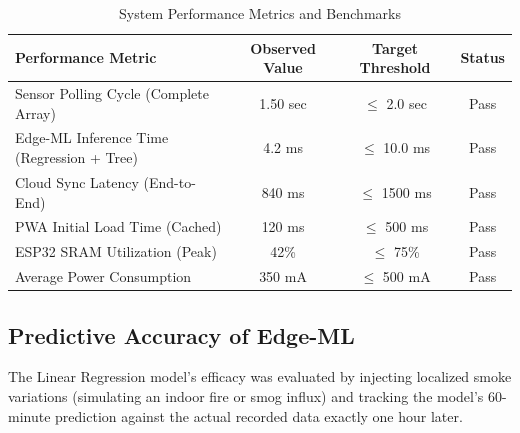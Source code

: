 \documentclass[12pt,journal,onecolumn,a4paper]{IEEEtran}
\begin{document}
\begin{table}[htbp]
\centering
\caption{System Performance Metrics and Benchmarks}
\begin{tabularx}{\textwidth}{@{} X c c c @{}}
\toprule
\textbf{Performance Metric} & \textbf{Observed Value} & \textbf{Target Threshold} & \textbf{Status} \\ \midrule
Sensor Polling Cycle (Complete Array) & 1.50 sec & $\leq$ 2.0 sec & Pass \\
Edge-ML Inference Time (Regression + Tree) & 4.2 ms & $\leq$ 10.0 ms & Pass \\
Cloud Sync Latency (End-to-End) & 840 ms & $\leq$ 1500 ms & Pass \\
PWA Initial Load Time (Cached) & 120 ms & $\leq$ 500 ms & Pass \\
ESP32 SRAM Utilization (Peak) & 42\% & $\leq$ 75\% & Pass \\ 
Average Power Consumption & 350 mA & $\leq$ 500 mA & Pass \\ \bottomrule
\end{tabularx}
\end{table}

\subsection{Predictive Accuracy of Edge-ML}
The Linear Regression model's efficacy was evaluated by injecting localized smoke variations (simulating an indoor fire or smog influx) and tracking the model's 60-minute prediction against the actual recorded data exactly one hour later. 
\end{document}

